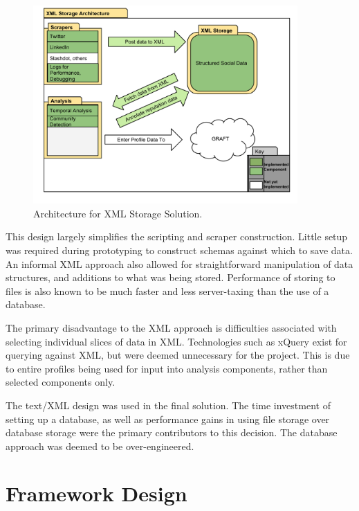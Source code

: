 \begin{figure}[h!]
\begin{center}
\centering
\includegraphics[width=0.9\textwidth]{Images/xml_storage_arch_v2.pdf}
\caption{Architecture for XML Storage Solution.}
\label{fig:xml_storage}
 \end{center}
\end{figure}
This design largely simplifies the scripting and scraper construction. Little setup was required during prototyping to construct schemas against which to save data. An informal XML approach also allowed for straightforward manipulation of data structures, and additions to what was being stored. Performance of storing to files is also known to be much faster and less server-taxing than the use of a database.

The primary disadvantage to the XML approach is difficulties associated with selecting individual slices of data in XML. Technologies such as xQuery exist for querying against XML, but were deemed unnecessary for the project. This is due to entire profiles being used for input into analysis components, rather than selected components only.

The text/XML design was used in the final solution. The time investment of setting up a database, as well as performance gains in using file storage over database storage were the primary contributors to this decision. The database approach was deemed to be over-engineered. 

\section{Framework Design}

